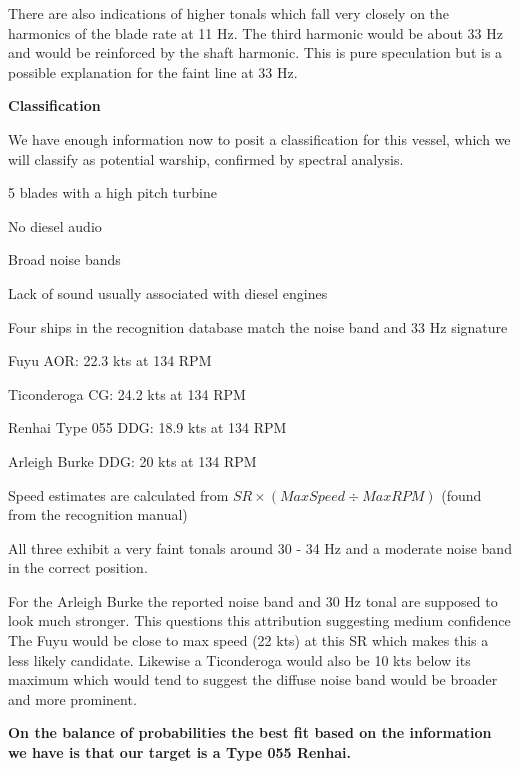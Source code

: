 There are also indications of higher tonals which fall very closely on the harmonics of the blade rate at 11 Hz. The third harmonic would be about 33 Hz and would be reinforced by the shaft harmonic. This is pure speculation but is a possible explanation for the faint line at 33 Hz.

\textbf{Classification}

We have enough information now to posit a classification for this vessel, which we will classify as potential warship, confirmed by spectral analysis.

\begin{compactenum}
    \item 5 blades with a high pitch turbine
    \item No diesel audio
    \item Broad noise bands
    \item Lack of sound usually associated with diesel engines
\end{compactenum}


Four ships in the recognition database match the noise band and 33 Hz signature

\begin{compactenum}
    \item Fuyu AOR: 22.3 kts at 134 RPM
    \item Ticonderoga CG: 24.2 kts at 134 RPM
    \item Renhai Type 055 DDG: 18.9 kts at 134 RPM
    \item Arleigh Burke DDG: 20 kts at 134 RPM
\end{compactenum}


Speed estimates are calculated from $SR \times (Max Speed \div Max RPM)$ (found from the recognition manual)

All three exhibit a very faint tonals around 30 - 34 Hz and a moderate noise band in the correct position.

For the Arleigh Burke the reported noise band and 30 Hz tonal are supposed to look much stronger. This questions this attribution suggesting medium confidence The Fuyu would be close to max speed (22 kts) at this SR which makes this a less likely candidate. Likewise a Ticonderoga would also be 10 kts below its maximum which would tend to suggest the diffuse noise band would be broader and more prominent.

\textbf{On the balance of probabilities the best fit based on the information we have is that our target is a Type 055 Renhai.}

